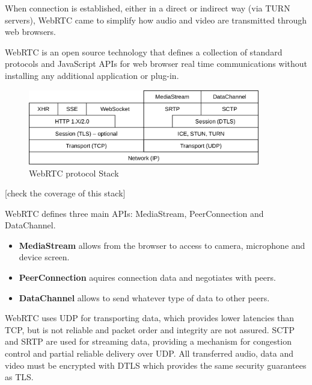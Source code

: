 When connection is established, either in a direct or indirect way (via \ac{TURN} servers), \ac{WebRTC} came to simplify how audio and video are transmitted through web browsers.

\ac{WebRTC} is an open source technology that defines a collection of standard protocols and JavaScript \ac{API}s for web browser real time communications without installing any additional application or plug-in.

\begin{figure}[H]
	\begin{center}
		\centering
		\includegraphics[width=0.9\textwidth]{figures/webrtc_stack.png}

	\caption{WebRTC protocol Stack}
	\end{center}
\end{figure}

{\color{magenta} [check the coverage of this stack]}

\ac{WebRTC} defines three main \ac{API}s: MediaStream, PeerConnection and DataChannel. 

\begin{itemize}
  \item \textbf{MediaStream} allows from the browser to access to camera, microphone and device screen. 

  \item \textbf{PeerConnection} aquires connection data and negotiates with peers.

  \item \textbf{DataChannel} allows to send whatever type of data to other peers.
\end{itemize}

\ac{WebRTC} uses \ac{UDP} for transporting data, which provides lower latencies than \ac{TCP}, but is not reliable and packet order and integrity are not assured. \ac{SCTP} and \ac{SRTP} are used for streaming data, providing a mechanism for congestion control and partial reliable delivery over \ac{UDP}. All transferred audio, data and video must be encrypted with \ac{DTLS} which provides the same security guarantees as \ac{TLS}. 

